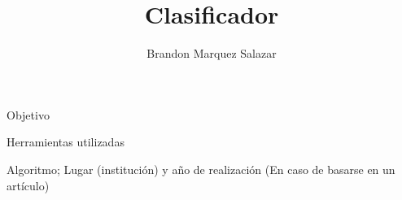 \documentclass[10pt]{beamer}
\author{%
Brandon Marquez Salazar
}
\title{%
  Clasificador
}
\begin{document}
  \frame{\titlepage}
  \begin{frame}
    {Objetivo}
  \end{frame}
  \begin{frame}
    {Herramientas utilizadas}
  \end{frame}
  \begin{frame}
    {Algoritmo; Lugar (institución) y año de realización (En caso de basarse en un artículo)}
  \end{frame}
\end{document}
